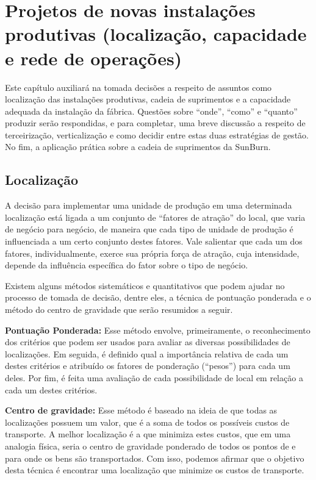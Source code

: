 
\chapter{Projetos de novas instalações produtivas (localização, capacidade e rede de operações)}
\label{chap:projetos_de_novas}

Este capítulo auxiliará na tomada decisões a respeito de assuntos como localização das instalações produtivas, cadeia de suprimentos e a capacidade adequada da instalação da fábrica. Questões sobre “onde”, “como” e “quanto” produzir serão respondidas, e para completar, uma breve discussão a respeito de terceirização, verticalização e como decidir entre estas duas estratégias de gestão. No fim, a aplicação prática sobre a cadeia de suprimentos da SunBurn.

\section{Localização}
\label{sec:projeto_de_novas_localizacao}

A decisão para implementar uma unidade de produção em uma determinada localização está ligada a um conjunto de ``fatores de atração'' do local, que varia de negócio para negócio, de maneira que cada tipo de unidade de produção é influenciada a um certo conjunto destes fatores. Vale salientar que cada um dos fatores, individualmente, exerce sua própria força de atração, cuja intensidade, depende da influência específica do fator sobre o tipo de negócio.

Existem alguns métodos sistemáticos e quantitativos que podem ajudar no processo de tomada de decisão, dentre eles, a técnica de pontuação ponderada e o método do centro de gravidade que serão resumidos a seguir.

\textbf{Pontuação Ponderada:} Esse método envolve, primeiramente, o reconhecimento dos critérios que podem ser usados para avaliar as diversas possibilidades de localizações. Em seguida, é definido qual a importância relativa de cada um destes critérios e atribuído os fatores de ponderação (``pesos'') para cada um deles. Por fim, é feita uma avaliação de cada possibilidade de local em relação a cada um destes critérios.

\textbf{Centro de gravidade:} Esse método é baseado na ideia de que todas as localizações possuem um valor, que é a soma de todos os possíveis custos de transporte. A melhor localização é a que minimiza estes custos, que em uma analogia física, seria o centro de gravidade ponderado de todos os pontos de e para onde os bens são transportados. Com isso, podemos afirmar que o objetivo desta técnica é encontrar uma localização que minimize os custos de transporte.


